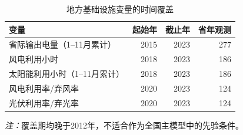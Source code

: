 \documentclass[UTF8,12pt]{ctexart}
\newcommand{\note}[1]{\begin{minipage}{0.96\textwidth}\footnotesize\textit{注：}#1\end{minipage}}
\begin{document}
\begin{table}[H]
\centering
\caption{地方基础设施变量的时间覆盖}
\begin{tabular}{lrrr}
\toprule
变量 & 起始年 & 截止年 & 省年观测 \\
\midrule
省际输出电量（1--11月累计） & 2015 & 2023 & 277 \\
风电利用小时 & 2018 & 2023 & 186 \\
太阳能利用小时（1--11月累计） & 2018 & 2023 & 186 \\
风电利用率/弃风率 & 2020 & 2023 & 124 \\
光伏利用率/弃光率 & 2020 & 2023 & 124 \\
\bottomrule
\end{tabular}
\note{覆盖期均晚于2012年，不适合作为全国主模型中的先验条件。}
\end{table}

\printbibliography[title={参考文献}]
\end{document}
